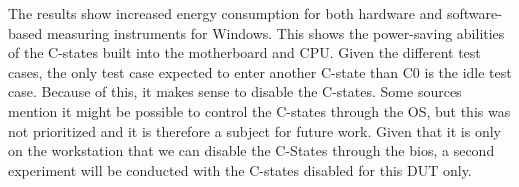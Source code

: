 

The results show increased energy consumption for both hardware and software-based measuring instruments for Windows. This shows the power-saving abilities of the C-states built into the motherboard and CPU. Given the different test cases, the only test case expected to enter another C-state than C0 is the idle test case. Because of this, it makes sense to disable the C-states. Some sources mention it might be possible to control the C-states through the OS\cite{CMete,CLinux}, but this was not prioritized and it is therefore a subject for future work. Given that it is only on the workstation that we can disable the C-States through the bios, a second experiment will be conducted with the C-states disabled for this DUT only.

